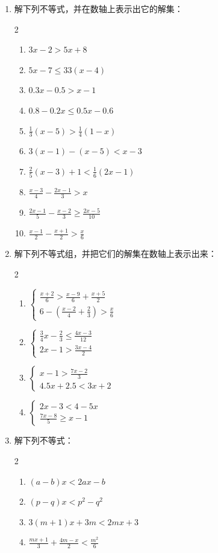 \begin{ex}
\begin{enumerate}
    \item  解下列不等式，并在数轴上表示出它的解集：
    \begin{multicols}{2}
\begin{enumerate}
\item $3 x-2>5 x+8$
\item $5 x-7 \le 33(x-4)$
\item  $0.3 x-0.5>x-1$
\item $0.8-0.2 x \le 0.5 x-0.6$
\item $\frac{1}{3}(x-5)>\frac{1}{4}(1-x)$
\item  $3(x-1)-(x-5)<x-3$
\item $\frac{2}{5}(x-3)+1<\frac{1}{6}(2 x-1) $
\item $\frac{x-3}{4}-\frac{2 x-1}{3}>x$
\item $\frac{2 x-1}{5}-\frac{x-2}{3} \geq \frac{2 x-5}{10}$
\item $\frac{x-1}{2}-\frac{x+1}{2}>\frac{x}{6}$
\end{enumerate}       
    \end{multicols}

\item 解下列不等式组，并把它们的解集在数轴上表示出来：
\begin{multicols}{2}
\begin{enumerate}
\item $\begin{cases}
    \frac{x+2}{6}>\frac{x-9}{6}+\frac{x+5}{2}\\
    6-\left(\frac{x-2}{4}+\frac{2}{3}\right)>\frac{x}{6}
\end{cases}$
\item $\begin{cases}
    \frac{3}{4}x-\frac{2}{3}\le \frac{4x-3}{12}\\
    2x-1>\frac{3x-4}{2}
\end{cases}$
\item $\begin{cases}
    x-1>\frac{7x-2}{3}\\
    4.5x+2.5<3x+2
\end{cases}$
\item $\begin{cases}
2x-3<4-5x\\
\frac{7x-8}{5}\ge x-1    
\end{cases}$
\end{enumerate}
\end{multicols}

\item 解下列不等式：
\begin{multicols}{2}
\begin{enumerate}
    \item $(a-b)x<2ax-b$
    \item $(p-q)x<p^2-q^2$
    \item $3(m+1)x+3m<2mx+3$
    \item $\frac{mx+1}{3}+\frac{4m-x}{2}<\frac{m^2}{6}$
\end{enumerate}
\end{multicols}
\end{enumerate}
\end{ex}    

